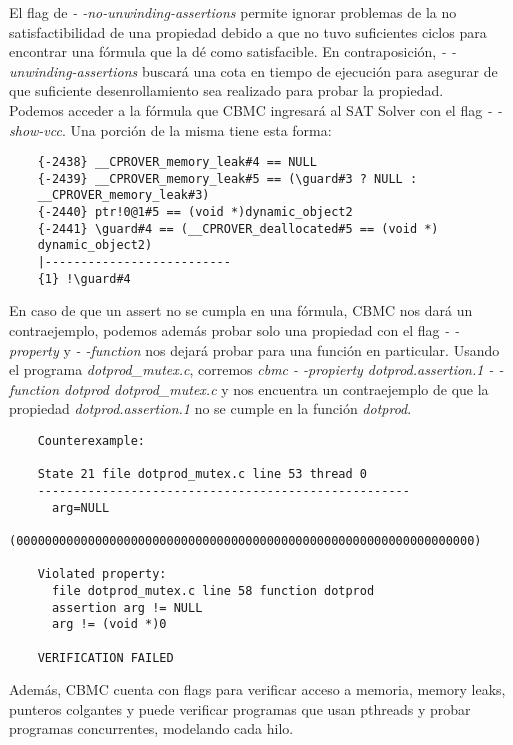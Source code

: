\documentclass{llncs}
\begin{document}
    \indent El flag de \emph{- -no-unwinding-assertions} permite ignorar
    problemas de la  no satisfactibilidad de una propiedad debido a que no tuvo
    suficientes ciclos para encontrar una fórmula que la dé como satisfacible.
    En contraposición, \emph{- -unwinding-assertions} buscará una cota en
    tiempo de ejecución para asegurar de que suficiente desenrollamiento sea
    realizado para probar la propiedad.\\
    \indent Podemos acceder a la fórmula que CBMC ingresará al
    SAT Solver con el flag \emph{- -show-vcc}. Una porción de la misma tiene
    esta forma:\\

    {\fontsize{7}{8}\selectfont
    \begin{lstlisting}
    {-2438} __CPROVER_memory_leak#4 == NULL
    {-2439} __CPROVER_memory_leak#5 == (\guard#3 ? NULL :
    __CPROVER_memory_leak#3)
    {-2440} ptr!0@1#5 == (void *)dynamic_object2
    {-2441} \guard#4 == (__CPROVER_deallocated#5 == (void *)
    dynamic_object2)
    |--------------------------
    {1} !\guard#4
    \end{lstlisting}
    }

    \indent En caso de que un assert no se cumpla en una fórmula, CBMC nos dará
    un contraejemplo, podemos además probar solo una propiedad con el flag
    \emph{- - property} y \emph{- -function} nos dejará probar para una función
    en particular. Usando el programa \emph{dotprod\_mutex.c}, corremos
    \emph{cbmc - -propierty dotprod.assertion.1
    - -function dotprod dotprod\_mutex.c} y nos encuentra un contraejemplo de
    que la propiedad \emph{dotprod.assertion.1} no se cumple en la función
    \emph{dotprod}.

    {\fontsize{7}{8}\selectfont
    \begin{lstlisting}
    Counterexample:

    State 21 file dotprod_mutex.c line 53 thread 0
    ----------------------------------------------------
      arg=NULL
      (0000000000000000000000000000000000000000000000000000000000000000)

    Violated property:
      file dotprod_mutex.c line 58 function dotprod
      assertion arg != NULL
      arg != (void *)0

    VERIFICATION FAILED
    \end{lstlisting}
    }

    \indent Además, CBMC cuenta con flags para verificar acceso a memoria,
    memory leaks, punteros colgantes y puede verificar programas que usan
    pthreads y probar programas concurrentes, modelando cada hilo.
\end{document}
